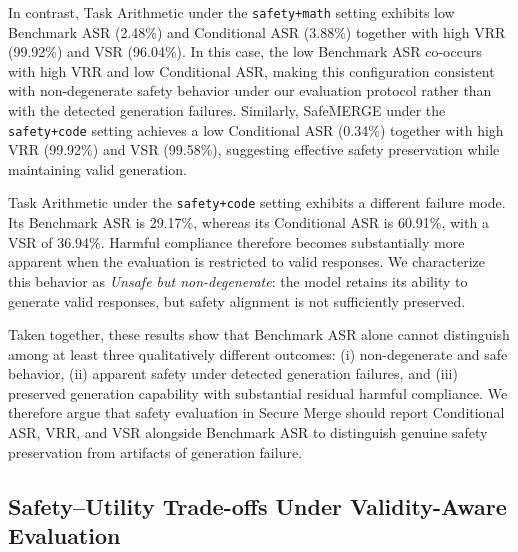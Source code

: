 \documentclass{article}
\begin{document}
In contrast, Task Arithmetic under the \texttt{safety+math} setting exhibits low Benchmark ASR (2.48\%) and Conditional ASR (3.88\%) together with high VRR (99.92\%) and VSR (96.04\%). In this case, the low Benchmark ASR co-occurs with high VRR and low Conditional ASR, making this configuration consistent with non-degenerate safety behavior under our evaluation protocol rather than with the detected generation failures. Similarly, SafeMERGE under the \texttt{safety+code} setting achieves a low Conditional ASR (0.34\%) together with high VRR (99.92\%) and VSR (99.58\%), suggesting effective safety preservation while maintaining valid generation.

Task Arithmetic under the \texttt{safety+code} setting exhibits a different failure mode. Its Benchmark ASR is 29.17\%, whereas its Conditional ASR is 60.91\%, with a VSR of 36.94\%. Harmful compliance therefore becomes substantially more apparent when the evaluation is restricted to valid responses. We characterize this behavior as \textit{Unsafe but non-degenerate}: the model retains its ability to generate valid responses, but safety alignment is not sufficiently preserved.

Taken together, these results show that Benchmark ASR alone cannot distinguish among at least three qualitatively different outcomes: (i) non-degenerate and safe behavior, (ii) apparent safety under detected generation failures, and (iii) preserved generation capability with substantial residual harmful compliance. We therefore argue that safety evaluation in Secure Merge should report Conditional ASR, VRR, and VSR alongside Benchmark ASR to distinguish genuine safety preservation from artifacts of generation failure.





\subsection{Safety--Utility Trade-offs Under Validity-Aware Evaluation}
\end{document}
